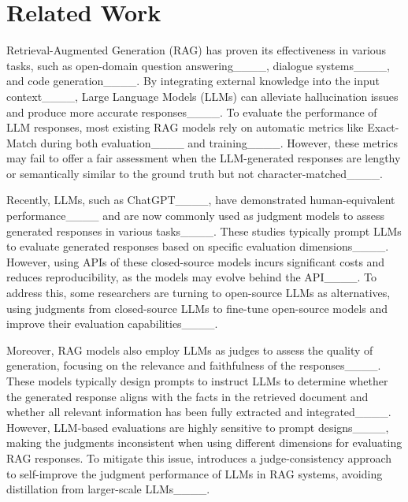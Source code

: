 \section{Related Work}
Retrieval-Augmented Generation (RAG) has proven its effectiveness in various tasks, such as open-domain question answering____, dialogue systems____, and code generation____. By integrating external knowledge into the input context____, Large Language Models (LLMs) can alleviate hallucination issues and produce more accurate responses____. To evaluate the performance of LLM responses, most existing RAG models rely on automatic metrics like Exact-Match during both evaluation____ and training____. However, these metrics may fail to offer a fair assessment when the LLM-generated responses are lengthy or semantically similar to the ground truth but not character-matched____.

Recently, LLMs, such as ChatGPT____, have demonstrated human-equivalent performance____ and are now commonly used as judgment models to assess generated responses in various tasks____. These studies typically prompt LLMs to evaluate generated responses based on specific evaluation dimensions____. However, using APIs of these closed-source models incurs significant costs and reduces reproducibility, as the models may evolve behind the API____. To address this, some researchers are turning to open-source LLMs as alternatives, using judgments from closed-source LLMs to fine-tune open-source models and improve their evaluation capabilities____.

Moreover, RAG models also employ LLMs as judges to assess the quality of generation, focusing on the relevance and faithfulness of the responses____. These models typically design prompts to instruct LLMs to determine whether the generated response aligns with the facts in the retrieved document and whether all relevant information has been fully extracted and integrated____. However, LLM-based evaluations are highly sensitive to prompt designs____, making the judgments inconsistent when using different dimensions for evaluating RAG responses. To mitigate this issue, \method{} introduces a judge-consistency approach to self-improve the judgment performance of LLMs in RAG systems, avoiding distillation from larger-scale LLMs____.










